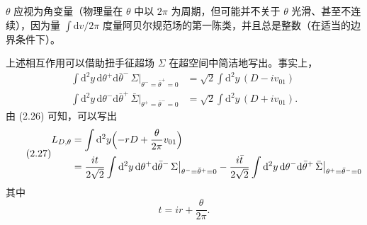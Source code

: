 
$\theta$ 应视为角变量（物理量在 $\theta$ 中以 $2\pi$ 为周期，但可能并不关于 $\theta$ 光滑、甚至不连续），因为量 $\int \mathrm{d}v/2\pi$ 度量阿贝尔规范场的第一陈类，并且总是整数（在适当的边界条件下）。

上述相互作用可以借助扭手征超场 $\Sigma$ 在超空间中简洁地写出。事实上，
\begin{equation}\tag{2.26}
\begin{aligned}
\int \mathrm{d}^{2}y\,\mathrm{d}\theta^+\mathrm{d}\bar\theta^-\,\Sigma\big|_{\theta^-=\bar\theta^+=0}&=\sqrt{2}\int \mathrm{d}^{2}y\,(D-iv_{01})\\[2pt]
\int \mathrm{d}^{2}y\,\mathrm{d}\theta^-\mathrm{d}\bar\theta^+\,\bar\Sigma\big|_{\theta^+=\bar\theta^-=0}&=\sqrt{2}\int \mathrm{d}^{2}y\,(D+iv_{01}).
\end{aligned}
\end{equation}
由 (2.26) 可知，可以写出
\begin{equation}\tag{2.27}
\begin{aligned}
L_{D,\theta}&=\int \mathrm{d}^{2}y\Bigl(-rD+\frac{\theta}{2\pi}v_{01}\Bigr)\\
&=\frac{it}{2\sqrt{2}}\int \mathrm{d}^{2}y\,\mathrm{d}\theta^+\mathrm{d}\bar\theta^-\,\Sigma\big|_{\theta^-=\bar\theta^+=0}-\frac{i\bar t}{2\sqrt{2}}\int \mathrm{d}^{2}y\,\mathrm{d}\theta^-\mathrm{d}\bar\theta^+\,\bar\Sigma\big|_{\theta^+=\bar\theta^-=0}
\end{aligned}
\end{equation}
其中
\begin{equation}\tag{2.28}
t=ir+\frac{\theta}{2\pi}.
\end{equation}


